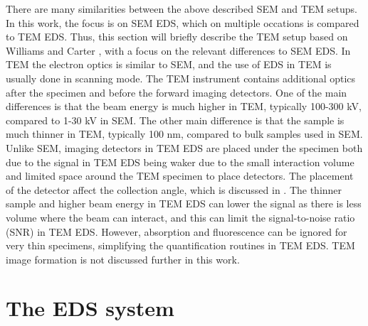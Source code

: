 There are many similarities between the above described SEM and TEM setups.
In this work, the focus is on SEM EDS, which on multiple occations is compared to TEM EDS.
Thus, this section will briefly describe the TEM setup based on Williams and Carter \cite{williams_carter_tem_2009}, with a focus on the relevant differences to SEM EDS.
In TEM the electron optics is similar to SEM, and the use of EDS in TEM is usually done in scanning mode.
The TEM instrument contains additional optics after the specimen and before the forward imaging detectors.
One of the main differences is that the beam energy is much higher in TEM, typically 100-300 kV, compared to 1-30 kV in SEM.
The other main difference is that the sample is much thinner in TEM, typically 100 nm, compared to bulk samples used in SEM.
Unlike SEM, imaging detectors in TEM EDS are placed under the specimen both due to the signal in TEM EDS being waker due to the small interaction volume and limited space around the TEM specimen to place detectors.
The placement of the detector affect the collection angle, which is discussed in .
The thinner sample and higher beam energy in TEM EDS can lower the signal as there is less volume where the beam can interact, and this can limit the signal-to-noise ratio (SNR) in TEM EDS.
However, absorption and fluorescence can be ignored for very thin specimens, simplifying the quantification routines in TEM EDS.
TEM image formation is not discussed further in this work.






























\clearpage


\section{The EDS system}
\label{theory:eds}




